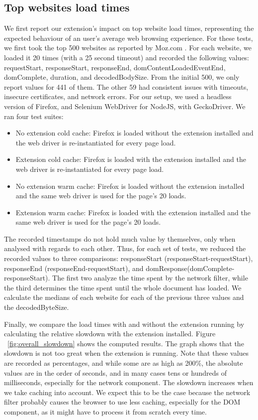 \subsection{Top websites load times}
We first report our extension's impact on top website load times, representing the expected behaviour of an user's average web browsing experience. For these tests, we first took the top 500 websites as reported by Moz.com \cite{top500}. For each website, we loaded it 20 times (with a 25 second timeout) and recorded the following values: requestStart, responseStart, responseEnd, domContentLoadedEventEnd, domComplete, duration, and decodedBodySize. From the initial 500, we only report values for 441 of them. The other 59 had consistent issues with timeouts, insecure certificates, and network errors. For our setup, we used a headless version of Firefox, and Selenium WebDriver for NodeJS, with GeckoDriver. We ran four test suites:
\begin{itemize}
	\item No extension cold cache: Firefox is loaded without the extension installed and the web driver is re-instantiated for every page load.
	\item Extension cold cache: Firefox is loaded with the extension installed and the web driver is re-instantiated for every page load.
	\item No extension warm cache: Firefox is loaded without the extension installed and the same web driver is used for the page's 20 loads.
	\item Extension warm cache: Firefox is loaded with the extension installed and the same web driver is used for the page's 20 loads.
\end{itemize}

The recorded timestamps do not hold much value by themselves, only when analysed with regards to each other. Thus, for each set of tests, we reduced the recorded values to three comparisons: responseStart (responseStart-requestStart), responseEnd (responseEnd-requestStart), and domResponse(domComplete-responseStart). The first two analyze the time spent by the network filter, while the third determines the time spent until the whole document has loaded. We calculate the medians of each website for each of the previous three values and the decodedByteSize.

Finally, we compare the load times with and without the extension running by calculating the relative slowdown with the extension installed. Figure ~\ref{fig:overall_slowdown} shows the computed results. The graph shows that the slowdown is not too great when the extension is running. Note that these values are recorded as percentages, and while some are as high as 200\%, the absolute values are in the order of seconds, and in many cases tens or hundreds of milliseconds, especially for the network component. The slowdown increases when we take caching into account. We expect this to be the case because the network filter probably causes the browser to use less caching, especially for the DOM component, as it might have to process it from scratch every time.

